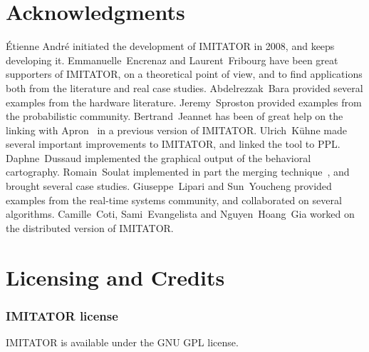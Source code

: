 \documentclass[a4paper,11pt]{report}
\newcommand{\imitator}{\textsf{IMITATOR}}
\begin{document}





\chapter{Acknowledgments}

\sloppy
\'Etienne André initiated the development of \imitator{} in 2008, and keeps developing it.
Emmanuelle~Encrenaz and Laurent~Fribourg have been great supporters of \imitator{}, on a theoretical point of view, and to find applications both from the literature and real case studies.
Abdelrezzak~Bara provided several examples from the hardware literature.
Jeremy~Sproston provided examples from the probabilistic community.
Bertrand~Jeannet has been of great help on the linking with Apron~\cite{JM09} in a previous version of \imitator{}.
Ulrich~K\"uhne made several important improvements to \imitator{}, and linked the tool to PPL.
Daphne~Dussaud implemented the graphical output of the behavioral cartography.
Romain~Soulat implemented in part the merging technique~\cite{AFS13atva}, and brought several case studies.
Giuseppe~Lipari and Sun~Youcheng provided examples from the real-time systems community, and collaborated on several algorithms.
Camille~Coti, Sami~Evangelista and Nguyen~Hoang~Gia worked on the distributed version of \imitator{}.



\chapter{Licensing and Credits}

\subsection*{\imitator{} license}
\imitator{} is available under the GNU GPL license.
\end{document}
